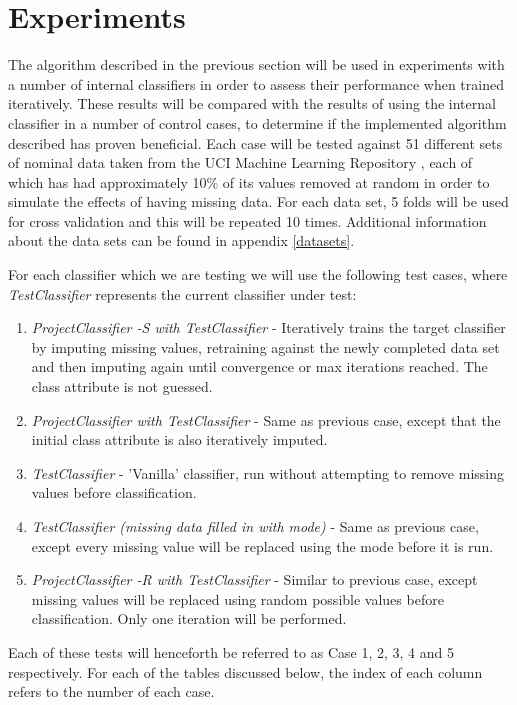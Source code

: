 \newpage
\chapter{Experiments}
The algorithm described in the previous section will be used in experiments with a number of internal classifiers in order to assess their performance when trained iteratively. These results will be compared with the results of using the internal classifier in a number of control cases, to determine if the implemented algorithm described has proven beneficial. Each case will be tested against 51 different sets of nominal data taken from the UCI Machine Learning Repository \cite{Lichman:2013}, each of which has had approximately 10\% of its values removed at random in order to simulate the effects of having missing data. For each data set, 5 folds will be used for cross validation and this will be repeated 10 times. Additional information about the data sets can be found in appendix \ref{datasets}.

For each classifier which we are testing we will use the following test cases, where \textit{TestClassifier} represents the current classifier under test:

\begin{enumerate}
\item \textit{ProjectClassifier -S with TestClassifier} - Iteratively trains the target classifier by imputing missing values, retraining against the newly completed data set and then imputing again until convergence or max iterations reached. The class attribute is not guessed.
\item \textit{ProjectClassifier with TestClassifier} - Same as previous case, except that the initial class attribute is also iteratively imputed.
\item \textit{TestClassifier} - 'Vanilla' classifier, run without attempting to remove missing values before classification.
\item \textit{TestClassifier (missing data filled in with mode)} - Same as previous case, except every missing value will be replaced using the mode before it is run.
\item \textit{ProjectClassifier -R with TestClassifier} - Similar to previous case, except missing values will be replaced using random possible values before classification. Only one iteration will be performed.
\end{enumerate}

Each of these tests will henceforth be referred to as Case 1, 2, 3, 4 and 5 respectively. For each of the tables discussed below, the index of each column refers to the number of each case. 

